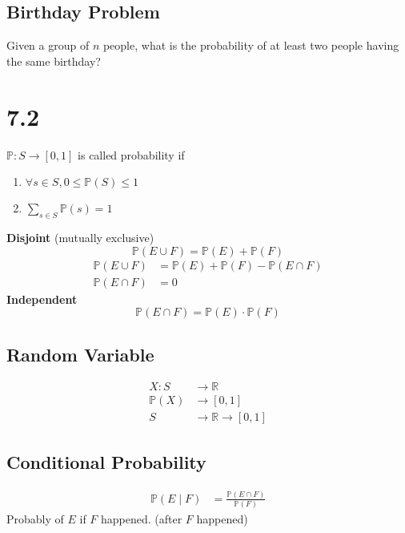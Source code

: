 \documentclass{article}
\begin{document}
\subsection{Birthday Problem}

Given a group of $ n $ people, what is the probability of at least two people having the same birthday?

\section{7.2}

$ \mathbb{P} \colon S \rightarrow [0, 1] $ is called probability if
\begin{enumerate}
	\item $ \forall s \in S, 0 \leq \mathbb{P}(S) \leq 1 $
	\item $ \sum_{s \in S} \mathbb{P}(s) = 1 $
\end{enumerate}

\textbf{Disjoint} (mutually exclusive)
\[ \mathbb{P}(E \cup F) = \mathbb{P}(E) + \mathbb{P}(F) \]
\begin{align*}
	\mathbb{P}(E \cup F) & = \mathbb{P}(E) + \mathbb{P}(F) - \mathbb{P}(E \cap F) \\
	\mathbb{P}(E \cap F) & = 0
\end{align*}
\textbf{Independent}
\[ \mathbb{P}(E \cap F) = \mathbb{P}(E) \cdot \mathbb{P}(F) \]

\subsection{Random Variable}

\begin{align*}
	X \colon S    & \rightarrow \mathbb{R}                    \\
	\mathbb{P}(X) & \rightarrow [0, 1]                        \\
	S             & \rightarrow \mathbb{R} \rightarrow [0, 1]
\end{align*}

\subsection{Conditional Probability}

\begin{align*}
	\mathbb{P}(E \mid F) & = \frac{ \mathbb{P}(E \cap F) }{ \mathbb{P}(F) }
\end{align*}
Probably of $ E $ if $ F $ happened. (after $ F $ happened)
\end{document}
